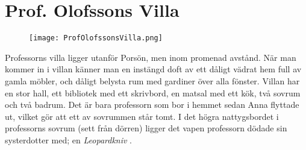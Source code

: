 \section{Prof. Olofssons Villa}
%
\begin{figure}[h]
\texttt{[image: ProfOlofssonsVilla.png]}
\centering
\end{figure}
%
\noindent Professorns villa ligger utanför Porsön, men inom promenad avstånd. När man kommer in i villan känner man en instängd doft av ett dåligt vädrat hem full av gamla möbler, och dåligt belysta rum med gardiner över alla fönster. Villan har en stor hall, ett bibliotek med ett skrivbord, en matsal med ett kök, två sovrum och två badrum. Det är bara professorn som bor i hemmet sedan Anna flyttade ut, vilket gör att ett av sovrummen står tomt. I det högra nattygsbordet i professorns sovrum (sett från dörren) ligger det vapen professorn dödade sin systerdotter med; en \textit{Leopardkniv} \sectiondescribe{\ref{itm:Leopardkniv}}.
